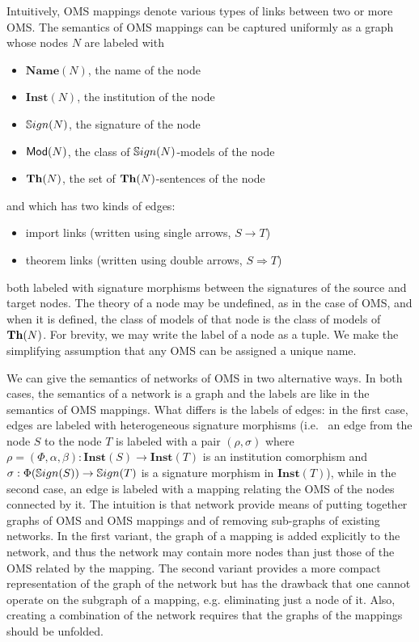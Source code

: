 \documentclass[10pt,fleqn,%
\ifpretendfinal
final%
\else
draft%
\fi,
]{scrreprt}
\newcommand{\Inst}{\ensuremath{\mathbf{Inst}}}
\newcommand{\Name}{\ensuremath{\mathbf{Name}}}
\begin{document}
Intuitively, OMS mappings denote various types of links between two or more OMS. 
The semantics of OMS mappings can be captured uniformly as a graph whose nodes $N$ are labeled with 
\begin{itemize}
 \item $\Name(N)$, the name of the node
 \item $\Inst(N)$, the institution of the node
 \item $\mathbb{S}ign(N)$, the signature of the node
 \item $\mathsf{Mod}(N)$, the class of $\mathbb{S}ign(N)$-models of the node
 \item $\mathbf{Th}(N)$, the set of $\mathbf{Th}(N)$-sentences of the node
\end{itemize}
and 
which has two kinds of edges:
\begin{itemize}
  \item import links (written using single arrows, $S\rightarrow T$)
  \item theorem links (written using double arrows, $S\Rightarrow T$)
\end{itemize}
both labeled with signature morphisms between the signatures of the source and target nodes. 
The theory of a node  may be undefined, as in the case of OMS, and when it is defined, 
the class of models of that node is the class of models of $\mathbf{Th}(N)$. 
For brevity, we may write the label of a node as a tuple. We make the simplifying 
assumption that any OMS can be assigned a unique name.

We can give the semantics of networks of OMS in two alternative ways.
In both cases, the semantics of a network is a graph and the labels
are like in the semantics of OMS mappings. What differs is the labels of
edges: in the first case, edges are labeled with heterogeneous signature morphisms (i.e.~ 
an edge from the node $S$ to the node $T$ is labeled with a pair 
$(\rho, \sigma)$ where $\rho=(\Phi,\alpha,\beta):\Inst(S)\to\Inst(T)$ is an institution comorphism and
$\sigma:\Phi(\mathbb{S}ign(S))\to\mathbb{S}ign(T)$ is a signature morphism in $\Inst(T)$), 
while in the second case, an edge is labeled with a mapping
relating the OMS of the nodes connected by it. 
The intuition is that
network provide means of putting together graphs of OMS and OMS mappings
and of removing sub-graphs of existing networks. In the first 
variant, the graph of a mapping is added explicitly to the network, and
thus the network may contain more nodes than just those of the OMS
related by the mapping. The second variant provides a more compact
representation of the graph of the network but has the drawback that
one cannot operate on the subgraph of a mapping, e.g. eliminating just a 
node of it. Also, creating a combination of the 
network requires that the graphs of the mappings 
should be unfolded.
\end{document}
